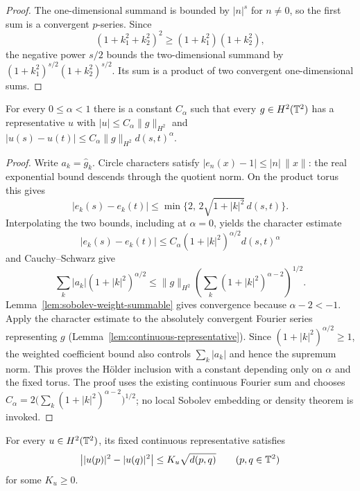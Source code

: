 \begin{proof}
\leanok
The one-dimensional summand is bounded by $|n|^s$ for $n\ne0$,
so the first sum is a convergent $p$-series. Since
\[
  (1+k_1^2+k_2^2)^2\ge(1+k_1^2)(1+k_2^2),
\]
the negative power $s/2$ bounds the two-dimensional summand by
$(1+k_1^2)^{s/2}(1+k_2^2)^{s/2}$. Its sum is a product of two
convergent one-dimensional sums.
\end{proof}

\begin{lemma}
\label{lem:sobolev-holder}
\leanok
For every $0\le\alpha<1$ there is a constant $C_\alpha$ such that every
$g\in H^2(\mathbb{T}^2)$ has a representative $u$ with
$|u|\le C_\alpha\|g\|_{H^2}$ and
$|u(s)-u(t)|\le C_\alpha\|g\|_{H^2}d(s,t)^\alpha$.
\end{lemma}

\begin{proof}
\leanok
Write $a_k=\hat g_k$. Circle characters satisfy
$|e_n(x)-1|\le |n|\,\|x\|$: the real exponential bound descends
through the quotient norm. On the product torus this gives
\[
 |e_k(s)-e_k(t)|\le
 \min\{2,\,2\sqrt{1+|k|^2}\,d(s,t)\}.
\]
Interpolating the two bounds, including at $\alpha=0$, yields the character estimate
\[
  |e_k(s)-e_k(t)|\le C_\alpha(1+|k|^2)^{\alpha/2}d(s,t)^\alpha
\]
and Cauchy--Schwarz give
\[
  \sum_k|a_k|(1+|k|^2)^{\alpha/2}
  \le \|g\|_{H^2}
      \left(\sum_k(1+|k|^2)^{\alpha-2}\right)^{1/2}.
\]
Lemma~\ref{lem:sobolev-weight-summable} gives convergence because
$\alpha-2<-1$. Apply the character estimate
to the absolutely convergent Fourier series representing $g$
(Lemma~\ref{lem:continuous-representative}). Since
$(1+|k|^2)^{\alpha/2}\ge1$, the weighted coefficient bound also controls
$\sum_k|a_k|$ and hence the supremum norm. This proves the H\"older inclusion
with a constant depending only on $\alpha$ and the fixed torus. The proof
uses the existing continuous Fourier sum and chooses
$C_\alpha=2\bigl(\sum_k(1+|k|^2)^{\alpha-2}\bigr)^{1/2}$;
no local Sobolev embedding or density theorem is invoked.
\end{proof}

\begin{lemma}
\label{lem:sobolev-squared-values}
\leanok
For every $u\in H^2(\mathbb{T}^2)$, its fixed continuous representative satisfies
\[
 \big||u(p)|^2-|u(q)|^2\big|\le K_u\sqrt{d(p,q)}
 \qquad(p,q\in\mathbb{T}^2)
\]
for some $K_u\ge0$.
\end{lemma}

